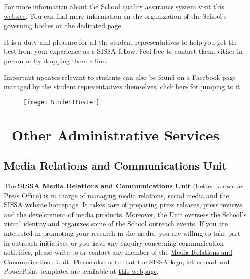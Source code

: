 \documentclass{sissavademecum}
\begin{document}
For more information about the School quality assurance system visit \href{https://www.sissa.it/qualita}{this website}. You can find more information on the organization of the School's governing bodies on the dedicated \href{https://www.sissa.it/general-organization}{page}.

It is a duty and pleasure for all the student representatives to help you get the best from your experience as a SISSA fellow. Feel free to contact them, either in person or by dropping them a line.

Important updates relevant to students can also be found on a Facebook page managed by the student representatives themselves, click \href{https://www.facebook.com/groups/sissastudents/}{here} for jumping to it.

\begin{figure}
	\vspace*{-12pt}
	\texttt{[image: StudentPoster]}
\end{figure}



\chapter{\texorpdfstring{\faChartBar\ }{}Other Administrative Services}


\section{Media Relations and Communications Unit}

The \textbf{SISSA Media Relations and Communications Unit} (better known as Press Office) is in charge of managing media relations, social media and the SISSA website homepage. It takes care of preparing press releases, press reviews and the development of media products. Moreover, the Unit oversees the School's visual identity and organizes some of the School outreach events. If you are interested in promoting your research in the media, you are willing to take part in outreach initiatives or you have any enquiry concerning communication activities, please write to  or contact any member of the \href{https://www.sissa.it/media-and-press}{Media Relations and Communications Unit}. Please also note that the SISSA logo, letterhead and PowerPoint templates are available at \href{https://www.sissa.it/researchers-and-sissa-staff}{this webpage}.
\end{document}
